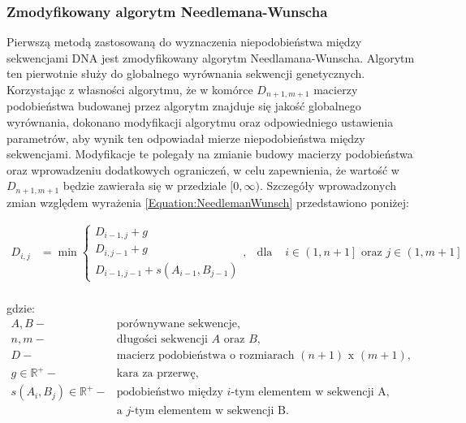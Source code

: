         \subsubsection{Zmodyfikowany algorytm Needlemana-Wunscha}\label{Method:NeedlemanWunsch}

            Pierwszą metodą zastosowaną do wyznaczenia niepodobieństwa między sekwencjami DNA jest  zmodyfikowany algorytm Needlamana-Wunscha. Algorytm ten pierwotnie służy do globalnego wyrównania sekwencji genetycznych. Korzystając z własności algorytmu, że w komórce $D_{n+1, m+1}$ macierzy podobieństwa budowanej przez algorytm znajduje się jakość globalnego wyrównania, dokonano modyfikacji algorytmu oraz odpowiedniego ustawienia parametrów, aby wynik ten odpowiadał mierze niepodobieństwa między sekwencjami. Modyfikacje te polegały na zmianie budowy macierzy podobieństwa oraz wprowadzeniu dodatkowych ograniczeń, w celu zapewnienia, że wartość w $D_{n+1, m+1}$ będzie zawierała się w przedziale $[0, \infty)$. Szczegóły wprowadzonych zmian względem wyrażenia \eqref{Equation:NeedlemanWunsch} przedstawiono poniżej:

            \begin{equation}
                \begin{aligned}
                    D_{i,j} &= \min
                    \begin{cases}
                    D_{i - 1, j} + g \\
                    D_{i, j - 1} + g \\
                    D_{i - 1, j - 1} + s(A_{i - 1}, B_{j - 1})
                    \end{cases}, & \text{dla } & i \in \left(1, n + 1\right] \text{ oraz } j \in \left(1, m + 1\right] \\
                \end{aligned}
            \end{equation}

            gdzie:
            \begin{align*}
                A, B -& \text{porównywane sekwencje}, \\
                n, m -& \text{długości sekwencji } A \text{ oraz } B, \\
                D -& \text{macierz podobieństwa o rozmiarach } (n + 1) \text{ x } (m + 1), \\
                g \in \mathbb{R}^{+} -& \text{kara za przerwę}, \\
                s(A_i, B_j) \in \mathbb{R}^{+} -& \text{podobieństwo między  } i\text{-tym elementem w sekwencji A,} \\
                & \text{a } j \text{-tym elementem w sekwencji B}. \\
            \end{align*}

